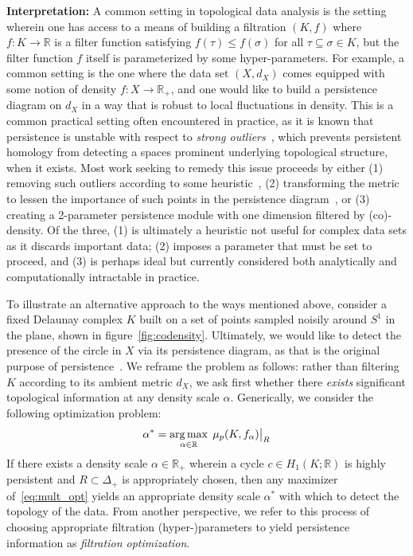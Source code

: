 \documentclass[10pt]{article}
\numberwithin{equation}{section}
\newcommand{\+}{%
	\raisebox{0.18ex}{\scaleobj{0.55}{+}}
}
\DeclareMathOperator*{\argmax}{arg\,max}
\newcommand\restr[2]{{%
  \left.\kern-\nulldelimiterspace %
  #1 %
  \vphantom{\big|} %
  \right|_{#2} %
  }}
\theoremstyle{definition}
\theoremstyle{definition}
\begin{document}
\noindent \textbf{Interpretation:} 
A common setting in topological data analysis is the setting wherein one has access to a means of building a filtration $(K,f)$ where $f : K \to \mathbb{R}$ is a filter function satisfying $f(\tau) \leq f(\sigma)$ for all $\tau \subseteq \sigma \in K$, but the filter function $f$ itself is parameterized by some hyper-parameters. 
For example, a common setting is the one where the data set $(X, d_X)$ comes equipped with some notion of density $f: X \to \mathbb{R}_+$, and one would like to build a persistence diagram on $d_X$ in a way that is robust to local fluctuations in density. 
This is a common practical setting often encountered in practice, as it is known that persistence is unstable with respect to \emph{strong outliers}~\cite{}, which prevents persistent homology from detecting a spaces prominent underlying topological structure, when it exists. 
Most work seeking to remedy this issue proceeds by either (1) removing such outliers according to some heuristic~\cite{}, (2) transforming the  metric to lessen the importance of such points in the persistence diagram~\cite{}, or (3) creating a 2-parameter persistence module with one dimension filtered by (co)-density. 
Of the three, (1) is ultimately a heuristic not useful for complex data sets as it discards important data; (2)  imposes a parameter that must be set to proceed, and (3) is perhaps ideal but currently considered both analytically and computationally intractable in practice. 

To illustrate an alternative approach to the ways mentioned above, consider a fixed Delaunay complex $K$ built on a set of points sampled noisily around $S^1$ in the plane, shown in figure~\ref{fig:codensity}. Ultimately, we would like to detect the presence of the circle in $X$ via its persistence diagram, as that is the original purpose of persistence~\cite{}. 
We reframe the problem as follows: rather than filtering $K$ according to its ambient metric $d_X$, we ask first whether there \emph{exists} significant topological information at any density scale $\alpha$. Generically, we consider the following optimization problem:   
\begin{equation}\label{eq:mult_opt}
	\alpha^\ast = \argmax_{\alpha \in \mathbb{R}} \; 
	\restr{\mu_p(K, f_\alpha)}{R}
\end{equation}
If there exists a density scale $\alpha \in \mathbb{R}_+$ wherein a cycle $c \in H_1(K ; \mathbb{R})$ is highly persistent and $R \subset \Delta_+$ is appropriately chosen, then any maximizer of~\eqref{eq:mult_opt} yields an appropriate density scale $\alpha^\ast$ with which to detect the topology of the data. 
From another perspective, we refer to this process of choosing appropriate filtration (hyper-)parameters to yield persistence information as \emph{filtration optimization}. 
\end{document}
